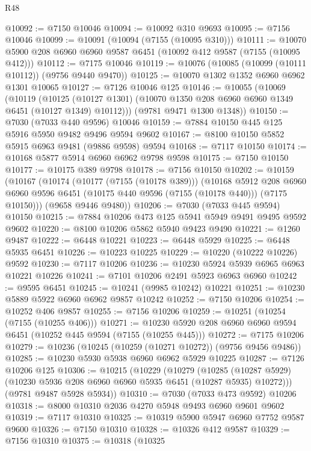 \begin{lexlean}{R48}
\begin{coremodule}
@10092 := @7150 @10046
@10094 := @10092 @310 @9693
@10095 := @7156 @10046
@10099 := @10091 (@10094 (@7155 (@10095 @310)))
@10111 := @10070 @5900 @208 @6960 @6960 @9587 @6451 (@10092 @412 @9587 (@7155 (@10095 @412)))
@10112 := @7175 @10046
@10119 := @10076 (@10085 (@10099 (@10111 @10112)) (@9756 @9440 @9470))
@10125 := @10070 @1302 @1352 @6960 @6962 @1301 @10065
@10127 := @7126 @10046 @125
@10146 := @10055
    (@10069
      (@10119
        (@10125 (@10127 @1301) (@10070 @1350 @208 @6960 @6960 @1349 @6451 (@10127 @1349) @10112)))
      (@9781 @9471 @1300 @1348))
@10150 := @7030 (@7033 @440 @9596) @10046
@10159 := @7884 @10150 @445 @125 @5916 @5950 @9482 @9496 @9594 @9602
@10167 := @8100 @10150 @5852 @5915 @6963 @9481 (@9886 @9598) @9594
@10168 := @7117 @10150
@10174 := @10168 @5877 @5914 @6960 @6962 @9798 @9598
@10175 := @7150 @10150
@10177 := @10175 @389 @9798
@10178 := @7156 @10150
@10202 := @10159
    (@10167
      (@10174
        (@10177 (@7155 (@10178 @389)))
        (@10168
          @5912
          @208
          @6960
          @6960
          @9596
          @6451
          (@10175 @440 @9596 (@7155 (@10178 @440)))
          (@7175 @10150)))
      (@9658 @9446 @9480))
@10206 := @7030 (@7033 @445 @9594) @10150
@10215 := @7884 @10206 @473 @125 @5941 @5949 @9491 @9495 @9592 @9602
@10220 := @8100 @10206 @5862 @5940 @9423 @9490
@10221 := @1260 @9487
@10222 := @6448 @10221
@10223 := @6448 @5929
@10225 := @6448 @5935 @6451
@10226 := @10223 @10225
@10229 := @10220 (@10222 @10226) @9592
@10230 := @7117 @10206
@10236 := @10230 @5924 @5939 @6965 @6963 @10221 @10226
@10241 := @7101 @10206 @2491 @5923 @6963 @6960
@10242 := @9595 @6451
@10245 := @10241 (@9985 @10242) @10221
@10251 := @10230 @5889 @5922 @6960 @6962 @9857 @10242
@10252 := @7150 @10206
@10254 := @10252 @406 @9857
@10255 := @7156 @10206
@10259 := @10251 (@10254 (@7155 (@10255 @406)))
@10271 := @10230 @5920 @208 @6960 @6960 @9594 @6451 (@10252 @445 @9594 (@7155 (@10255 @445)))
@10272 := @7175 @10206
@10279 := @10236 (@10245 (@10259 (@10271 @10272)) (@9756 @9456 @9486))
@10285 := @10230 @5930 @5938 @6960 @6962 @5929 @10225
@10287 := @7126 @10206 @125
@10306 := @10215
    (@10229
      (@10279
        (@10285 (@10287 @5929) (@10230 @5936 @208 @6960 @6960 @5935 @6451 (@10287 @5935) @10272)))
      (@9781 @9487 @5928 @5934))
@10310 := @7030 (@7033 @473 @9592) @10206
@10318 := @8000 @10310 @2036 @4270 @5948 @9493 @6960 @9601 @9602
@10319 := @7117 @10310
@10325 := @10319 @5900 @5947 @6960 @7752 @9587 @9600
@10326 := @7150 @10310
@10328 := @10326 @412 @9587
@10329 := @7156 @10310
@10375 := @10318
    (@10325

\end{coremodule}
\end{lexlean}
